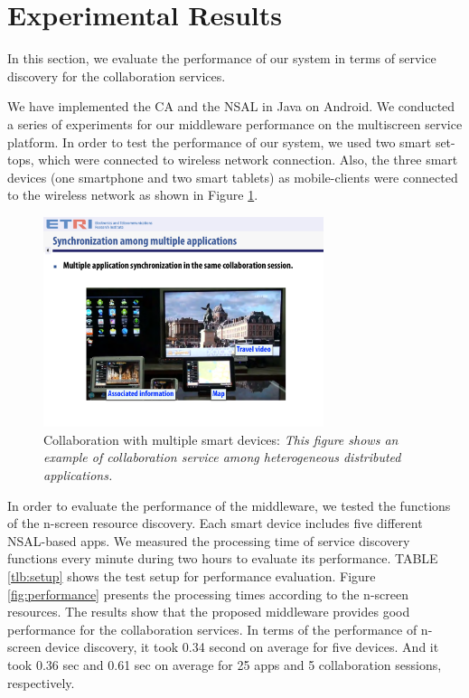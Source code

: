 \documentclass[conference]{IEEEtran}
\begin{document}
%
\section{Experimental Results}
\label{sc:Experiments}
In this section, we evaluate the performance of our system in terms of service discovery for the collaboration services. 

We have implemented the CA and the NSAL in Java on Android. 
We conducted a series of experiments for our middleware performance  on the multiscreen service platform. 
In order to test the performance of our system, we used two smart set-tops, 
which were connected to wireless network connection. Also, the three smart devices (one smartphone and two smart tablets) as mobile-clients 
were connected to the wireless network as shown in Figure \ref{fig:multiplecollaboration}. 
    \begin{figure}[htb] %
    \centering
    \includegraphics[width=8.2cm,keepaspectratio]{multiplecollaboration_2}
    \caption{Collaboration with multiple smart devices: \emph{This figure shows an example of collaboration service among heterogeneous distributed applications.}}
    \label{fig:multiplecollaboration}
    \end{figure}

In order to evaluate the performance of the middleware, we tested the functions of the n-screen resource discovery. Each
smart device includes five different NSAL-based apps. We measured the processing time of service discovery functions every minute during two hours to evaluate its performance. TABLE \ref{tlb:setup} shows the test setup for performance evaluation.
Figure \ref{fig:performance} presents the processing times according to the n-screen resources. The results show that the proposed middleware provides good performance for the collaboration services. In terms of the performance of n-screen device discovery, it took 0.34 second on average for five devices. And it took 0.36 sec and 0.61 sec on average for 25 apps and 5 collaboration sessions, respectively.
\end{document}
